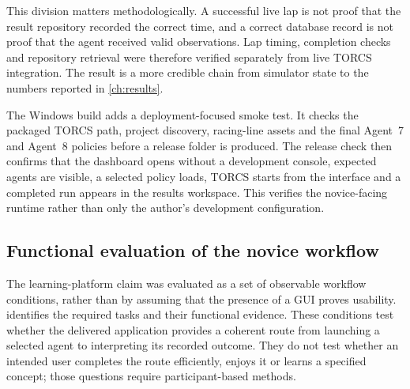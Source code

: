 This division matters methodologically. A successful live lap is not proof that the result repository recorded the correct time, and a correct database record is not proof that the agent received valid observations. Lap timing, completion checks and repository retrieval were therefore verified separately from live TORCS integration. The result is a more credible chain from simulator state to the numbers reported in \cref{ch:results}.

The Windows build adds a deployment-focused smoke test. It checks the packaged TORCS path, project discovery, racing-line assets and the final Agent~7 and Agent~8 policies before a release folder is produced. The release check then confirms that the dashboard opens without a development console, expected agents are visible, a selected policy loads, TORCS starts from the interface and a completed run appears in the results workspace. This verifies the novice-facing runtime rather than only the author's development configuration.

\subsection{Functional evaluation of the novice workflow}

The learning-platform claim was evaluated as a set of observable workflow conditions, rather than by assuming that the presence of a GUI proves usability.  identifies the required tasks and their functional evidence. These conditions test whether the delivered application provides a coherent route from launching a selected agent to interpreting its recorded outcome. They do not test whether an intended user completes the route efficiently, enjoys it or learns a specified concept; those questions require participant-based methods.

